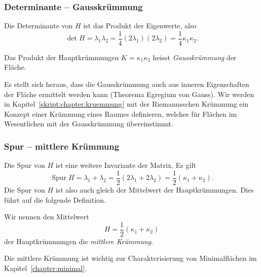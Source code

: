 \subsubsection{Determinante -- Gausskrümmung}
Die Determinante von $H$ ist das Produkt der Eigenwerte, also
\[
\det H
=
\lambda_1\lambda_2
=
\frac14 (2\lambda_1) (2\lambda_2)
=
\frac14 \kappa_1\kappa_2.
\]
\begin{definition}
\label{skript:definition:gausskruemmung}
Das Produkt der Hauptkrümmungen $K=\kappa_1\kappa_2$
heisst {\em Gausskrümmung} der Fläche.
\end{definition}
Es stellt sich heraus, dass die Gausskrümmung auch aus inneren Eigenschaften
der Fläche ermittelt werden kann
(Theorema Egregium von Gauss).
Wir werden in Kapitel~\ref{skript:chapter:kruemmung} 
mit der Riemannsschen Krümmung ein Konzept einer Krümmung eines Raumes
definieren, welches für Flächen im Wesentlichen mit der Gausskrümmung
übereinstimmt.

\subsubsection{Spur -- mittlere Krümmung}
Die Spur von $H$ ist eine weitere Invariante der Matrix.
Es gilt
\[
\operatorname{Spur} H
=
\lambda_1+\lambda_2
=
\frac12(2\lambda_1+2\lambda_2)
=
\frac12(\kappa_1+\kappa_2).
\]
Die Spur von $H$ ist also auch gleich der Mittelwert der Hauptkrümmungen.
Dies führt auf die folgende Definition.

\begin{definition}
\label{skript:definition:mittlerekruemmung}
Wir nennen den Mittelwert
\[
H=\frac12(\kappa_1+\kappa_2)
\]
der Hauptkrümmungen die {\em mittlere Krümmung}.
\end{definition}
Die mittlere Krümmung ist wichtig zur Charakterisierung von Minimalflächen
im Kapitel~\ref{chapter:minimal}.









